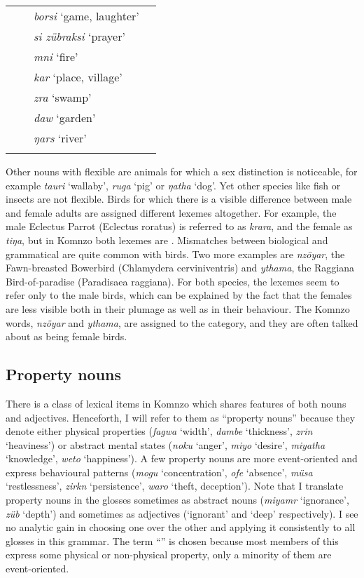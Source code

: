 \begin{table}
\begin{tabular}{>{\raggedright}p{2cm}l>{\raggedright}p{}>{\raggedright\arraybackslash}p{}}
		&&\emph{borsi} `game, laughter'&\\
		&&\emph{si zübraksi} `prayer'&\\\midrule
		\multirow{5}{1,8cm}{landscape}&\multirow{5}{*}{\F}&\emph{mni} `fire'&\\
		&&\emph{kar} `place, village'&\\
		&&\emph{zra} `swamp'&\\
		&&\emph{daw} `garden'&\\
		&&\emph{ŋars} `river'&\\
		\lspbottomrule
	\end{tabular}
\end{table}

Other nouns with flexible  are animals for which a sex distinction is noticeable, for example \emph{tauri} `wallaby', \emph{ruga} `pig' or \emph{ŋatha} `dog'. Yet other species like fish or insects are not flexible. Birds for which there is a visible difference between male and female adults are assigned different lexemes altogether. For example, the male Eclectus Parrot (Eclectus roratus) is referred to as \emph{krara}, and the female as \emph{tiŋa}, but in Komnzo both lexemes are . Mismatches between biological  and grammatical  are quite common with birds. Two more examples are \emph{nzöyar}, the Fawn-breasted Bowerbird (Chlamydera cerviniventris) and \emph{ythama}, the Raggiana Bird-of-paradise (Paradisaea raggiana). For both species, the lexemes seem to refer only to the male birds, which can be explained by the fact that the females are less visible both in their plumage as well as in their behaviour. The Komnzo words, \emph{nzöyar} and \emph{ythama}, are assigned to the  category, and they are often talked about as being female birds.

\subsection{Property nouns} \label{propertynouns-sec}

There is a class of lexical items in Komnzo which shares features of both nouns and adjectives. Henceforth, I will refer to them as ``property nouns'' because they denote either physical properties (\emph{fagwa} `width', \emph{dambe} `thickness', \emph{zrin} `heaviness') or abstract mental states (\emph{noku} `anger', \emph{miyo} `desire', \emph{miyatha} `knowledge', \emph{weto} `happiness'). A few property nouns are more event-oriented and express behavioural patterns (\emph{mogu} `concentration', \emph{ofe} `absence', \emph{müsa} `restlessness', \emph{zirkn} `persistence', \emph{waro} `theft, deception'). Note that I translate property nouns in the glosses sometimes as abstract nouns (\emph{miyamr} `ignorance', \emph{züb} `depth') and sometimes as adjectives (`ignorant' and `deep' respectively). I see no analytic gain in choosing one over the other and applying it consistently to all glosses in this grammar. The term ``'' is chosen because most members of this  express some physical or non-physical property, only a minority of them are event-oriented.

